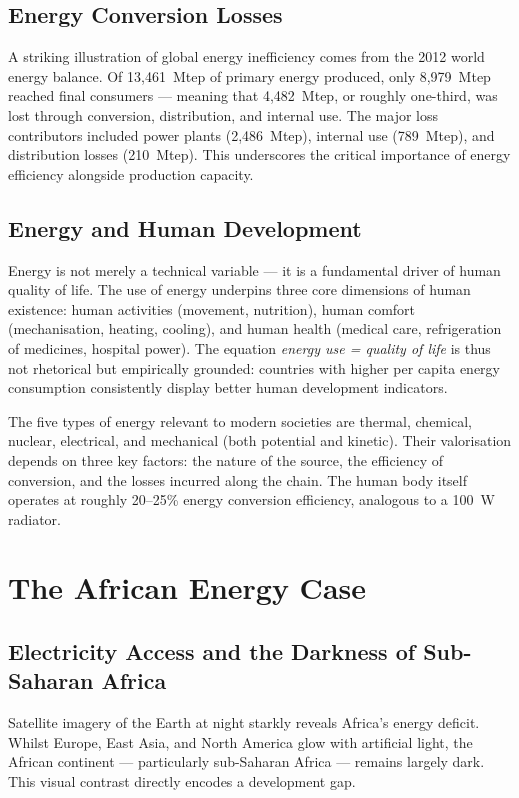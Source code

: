 \subsection{Energy Conversion Losses}

A striking illustration of global energy inefficiency comes from the 2012 world energy balance. Of 13{,}461~Mtep of primary energy produced, only 8{,}979~Mtep reached final consumers — meaning that 4{,}482~Mtep, or roughly one-third, was lost through conversion, distribution, and internal use. The major loss contributors included power plants (2{,}486~Mtep), internal use (789~Mtep), and distribution losses (210~Mtep). This underscores the critical importance of energy efficiency alongside production capacity.

\subsection{Energy and Human Development}

Energy is not merely a technical variable — it is a fundamental driver of human quality of life. The use of energy underpins three core dimensions of human existence: human activities (movement, nutrition), human comfort (mechanisation, heating, cooling), and human health (medical care, refrigeration of medicines, hospital power). The equation \textit{energy use = quality of life} is thus not rhetorical but empirically grounded: countries with higher per capita energy consumption consistently display better human development indicators.

The five types of energy relevant to modern societies are thermal, chemical, nuclear, electrical, and mechanical (both potential and kinetic). Their valorisation depends on three key factors: the nature of the source, the efficiency of conversion, and the losses incurred along the chain. The human body itself operates at roughly 20--25\% energy conversion efficiency, analogous to a 100~W radiator.

\section{The African Energy Case}

\subsection{Electricity Access and the Darkness of Sub-Saharan Africa}

Satellite imagery of the Earth at night starkly reveals Africa's energy deficit. Whilst Europe, East Asia, and North America glow with artificial light, the African continent — particularly sub-Saharan Africa — remains largely dark. This visual contrast directly encodes a development gap.

